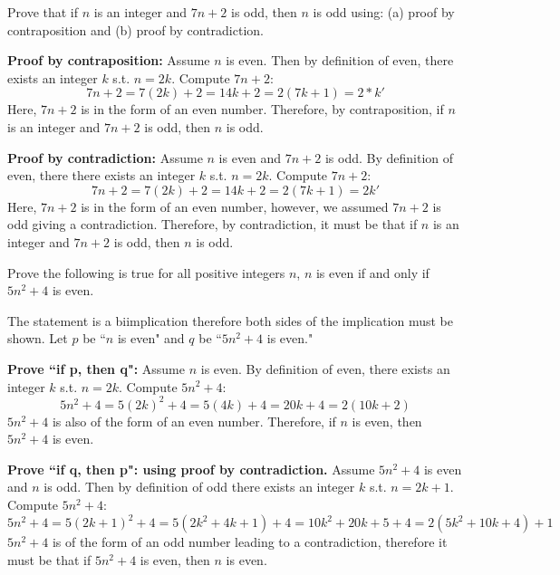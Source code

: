 \documentclass[12pt,addpoints]{exam}
\begin{document}
\begin{questions}
% 
\question[16]  Prove that if $n$ is an integer and $7n+2$ is odd,
then $n$ is odd using: (a) proof by contraposition and (b) proof by
contradiction.
    \ifprintanswers
        \vspace{-10pt}
    \fi
\begin{solution} \textbf{Proof by contraposition:}
    Assume $n$ is even.  Then by definition of even, there exists an
    integer $k$ s.t. $n=2k$.  Compute $7n+2$:
    \[ 7n+2 = 7(2k)+2 = 14k+2 = 2(7k+1) = 2*k'\]
    Here, $7n+2$ is in the form of an even number.  Therefore, by
    contraposition, if $n$ is an integer and $7n+2$ is odd,
    then $n$ is odd.

    \medskip
    \textbf{Proof by contradiction:} Assume $n$ is even and $7n+2$ is
    odd.  By definition of even, there there exists an
    integer $k$ s.t. $n=2k$.  Compute $7n+2$:
    \[ 7n+2 = 7(2k)+2 = 14k+2 = 2(7k+1) = 2k' \]
    Here, $7n+2$ is in the form of an even number, however, we assumed
    $7n+2$ is odd giving a contradiction. Therefore, by
    contradiction, it must be that if $n$ is an integer and $7n+2$ is
    odd, then $n$ is odd.
\end{solution}


% 
\question[16] Prove the following is true for all positive integers $n$, $n$ is even if and only if $5n^2 + 4$ is even.
    \ifprintanswers
        \vspace{-10pt}
    \fi
\begin{solution}
    The statement is a biimplication therefore both sides of the
    implication must be shown.  Let $p$ be ``$n$ is even" and $q$ be
    ``$5n^2 + 4$ is even."
    
    \textbf{Prove ``if p, then q":}
    Assume $n$ is even. By definition of even, there exists an
    integer $k$ s.t. $n=2k$.  Compute $5n^2+4$:
    \[ 5n^2 + 4 = 5(2k)^2 + 4 = 5(4k) + 4 = 20k + 4 = 2(10k+2) \]
    $5n^2+4$ is also of the form of an even number.  Therefore, if $n$
    is even, then $5n^2+4$ is even.

    \smallskip
    \textbf{Prove ``if q, then p": using proof by contradiction.}
    Assume $5n^2+4$ is even and $n$ is odd.  Then by definition of odd
    there exists an integer $k$ s.t. $n=2k+1$.  Compute $5n^2+4$:
    \[ 5n^2+4 = 5(2k+1)^2+4 = 5(2k^2+4k+1)+4 = 10k^2 + 20k + 5 + 4 = 2(5k^2 + 10k + 4) + 1 \]
    $5n^2+4$ is of the form of an odd number leading to a
    contradiction, therefore it must be that if $5n^2+4$ is even, then
    $n$ is even.


\end{solution}
\end{questions}
\end{document}
